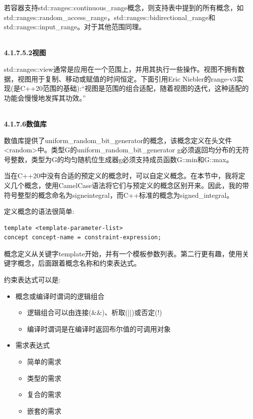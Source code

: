 若容器支持std::ranges::continuous\_range概念，则支持表中提到的所有概念，如std::ranges::random\_access\_range，std::ranges::bidirectional\_range和std::ranges::input\_range。对于其他范围同理。

\hspace*{\fill} \\ %
\noindent
\textbf{4.1.7.5.2\hspace{0.2cm}视图}

std::ranges::view通常是应用在一个范围上，并用其执行一些操作。视图不拥有数据，视图用于复制、移动或赋值的时间恒定。下面引用Eric Niebler的range-v3实现(是C++20范围的基础):“视图是范围的组合适配，随着视图的迭代，这种适配的功能会慢慢地发挥其功效。”

\hspace*{\fill} \\ %
\noindent
\textbf{4.1.7.6\hspace{0.2cm}数值库}

数值库提供了uniform\_random\_bit\_generator的概念，该概念定义在头文件<random>中。类型G的uniform\_random\_bit\_generator g必须返回均分布的无符号整数，类型为G的均匀随机位生成器g必须支持成员函数G::min和G::max。


当在C++20中没有合适的预定义的概念时，可以自定义概念。在本节中，我将定义几个概念，使用CamelCase语法将它们与预定义的概念区别开来。因此，我的带符号整型的概念命名为signeintegral，而C++标准的概念为signed\_integral。

定义概念的语法很简单:

\begin{lstlisting}[style=styleCXX]
template <template-parameter-list>
concept concept-name = constraint-expression;
\end{lstlisting}

概念定义从关键字template开始，并有一个模板参数列表。第二行更有趣，使用关键字概念，后面跟着概念名称和约束表达式。

约束表达式可以是:

\begin{itemize}
\item
概念或编译时谓词的逻辑组合

\begin{itemize}
\item
逻辑组合可以由连接(\&\&)、析取(||)或否定(!)

\item
编译时谓词是在编译时返回布尔值的可调用对象
\end{itemize}

\item
需求表达式
\begin{itemize}
\item
简单的需求

\item
类型的需求

\item
复合的需求

\item
嵌套的需求
\end{itemize}
\end{itemize}

